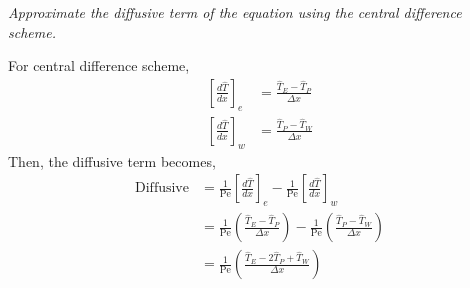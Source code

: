 \section{}
\textit{Approximate the diffusive term of the equation using the central
difference scheme.}

For central difference scheme,
\begin{align*}
    \left[\frac{d \hat{T}}{dx}\right]_e &= \frac{\hat{T}_E - \hat{T}_P}{\Delta x} \\
    \left[\frac{d \hat{T}}{dx}\right]_w &= \frac{\hat{T}_P - \hat{T}_W}{\Delta x}
\end{align*}
Then, the diffusive term becomes,
\begin{align*}
    \text{Diffusive} &= \frac{1}{\text{Pe}} \left[\frac{d \hat{T}}{dx}\right]_e - \frac{1}{\text{Pe}} \left[\frac{d \hat{T}}{dx}\right]_w \\
    &= \frac{1}{\text{Pe}} \left(\frac{\hat{T}_E - \hat{T}_P}{\Delta x}\right) - \frac{1}{\text{Pe}} \left(\frac{\hat{T}_P - \hat{T}_W}{\Delta x}\right) \\
    &= \boxed{\frac{1}{\text{Pe}} \left(\frac{\hat{T}_E - 2\hat{T}_P + \hat{T}_W}{\Delta x}\right)}
\end{align*}